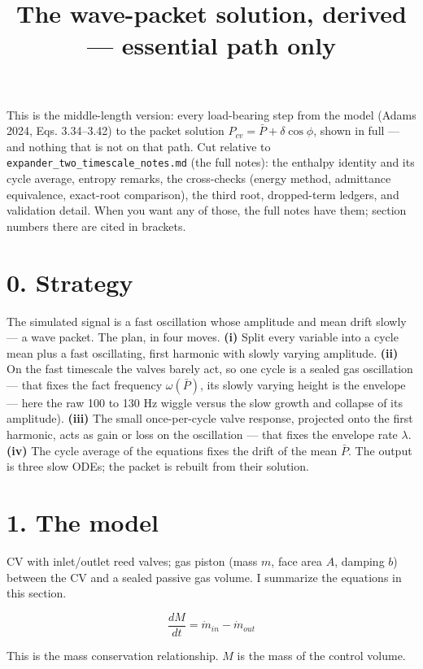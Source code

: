 \documentclass[11pt]{article}
\title{The wave-packet solution, derived --- essential path only}
\author{}
\date{}
\begin{document}
\maketitle
This is the middle-length version: every load-bearing step from the model (Adams 2024, Eqs. 3.34--3.42) to the packet solution $P_{cv} = \bar P + \delta\cos\phi$, shown in full --- and nothing that is not on that path. Cut relative to \texttt{expander\_two\_timescale\_notes.md} (the full notes): the enthalpy identity and its cycle average, entropy remarks, the cross-checks (energy method, admittance equivalence, exact-root comparison), the third root, dropped-term ledgers, and validation detail. When you want any of those, the full notes have them; section numbers there are cited in brackets.

\section*{0. Strategy}

The simulated signal is a fast oscillation whose amplitude and mean drift slowly --- a wave packet. The plan, in four moves. \textbf{(i)} Split every variable into a cycle mean plus a fast oscillating, first harmonic with slowly varying amplitude. \textbf{(ii)} On the fast timescale the valves barely act, so one cycle is a sealed gas oscillation --- that fixes the fact frequency $\omega(\bar P)$, its slowly varying height is the envelope --- here the raw 100 to 130 Hz wiggle versus the slow growth and collapse of its amplitude). \textbf{(iii)} The small once-per-cycle valve response, projected onto the first harmonic, acts as gain or loss on the oscillation --- that fixes the envelope rate $\lambda$. \textbf{(iv)} The cycle average of the equations fixes the drift of the mean $\bar P$. The output is three slow ODEs; the packet is rebuilt from their solution.

\section*{1. The model}

CV with inlet/outlet reed valves; gas piston (mass $m$, face area $A$, damping $b$) between the CV and a sealed passive gas volume. I summarize the equations in this section. 

\begin{equation}
\frac{dM}{dt} = \dot{m}_{in} - \dot{m}_{out} \tag{1}
\end{equation}

This is the mass conservation relationship. $M$ is the mass of the control volume. 
\end{document}
